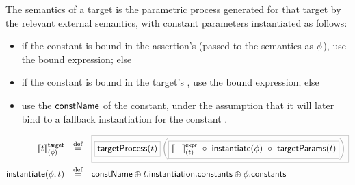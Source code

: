 \begin{defn}[\mtarget]

The semantics of a target is the parametric process generated for that
target by the relevant external semantics, with constant parameters instantiated
as follows:

\begin{itemize}
\item
	if the constant is bound in the assertion's \mtargetinstantiation{}
	(passed to the semantics as \(\phi\)), use the bound expression; else
\item
	if the constant is bound in the target's \mtargetinstantiation, use
	the bound expression; else
\item
	use the \(\mathsf{constName}\) of the constant, under the assumption
	that it will later bind to a fallback instantiation for the constant
	.
\end{itemize}
%
\begin{align*}
	\targetsema{\atarget}{\aninst}
\quad\defeq\quad&
\tlang{
	\olang{\funcname{targetProcess}(\atarget)}
	\left(
		\olang{\exprsema{-}{\atarget}\ \circ\ \funcname{instantiate}(\aninst)\ \circ\ \funcname{targetParams}(\atarget)}
	\right)
}
\\
	\funcname{instantiate}(\aninst, \atarget)
\quad\defeq\quad&
	\funcname{constName}
	\oplus
	\field{\field{\atarget}{instantiation}}{constants}
	\oplus
	\field{\aninst}{constants}
\end{align*}
\end{defn}



